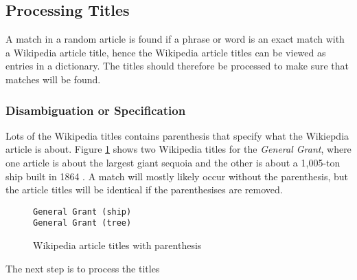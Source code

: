 \subsection{Processing Titles}
A match in a random article is found if a phrase or word is an exact match with a Wikipedia article title, hence the Wikipedia article titles can be viewed as entries in a dictionary. The titles should therefore be processed to make sure that matches will be found. 

\subsubsection{Disambiguation or Specification}
Lots of the Wikipedia titles contains parenthesis that specify what the Wikiepdia article is about. Figure \ref{fig:parenthesis_example} shows two Wikipedia titles for the \emph{General Grant}, where one article is about the largest giant sequoia \cite{wiki:generalgranttree} and the other is about a 1,005-ton ship built in 1864 \cite{wiki:generalgrantship}. A match will mostly likely occur without the parenthesis, but the article titles will be identical if the parenthesises are removed. 

\begin{figure}[h]
\centering
\begin{lstlisting}
General Grant (ship)
General Grant (tree)
\end{lstlisting}
\caption{Wikipedia article titles with parenthesis}
\label{fig:parenthesis_example}
\end{figure}



The next step is to process the titles